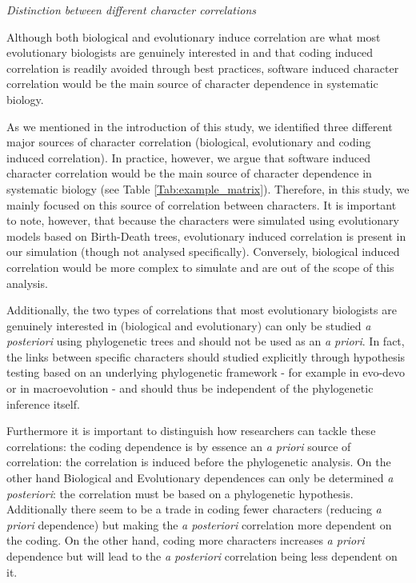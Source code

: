 \documentclass[12pt,letterpaper]{article}
\renewcommand{\subsection}[1]{%
\bigskip
\begin{center}
\begin{large}
\normalfont\itshape #1
\end{large}
\end{center}}
\begin{document}
\subsection{Distinction between different character correlations}
Although both biological and evolutionary induce correlation are what most evolutionary biologists are genuinely interested in and that coding induced correlation is readily avoided through best practices, software induced character correlation would be the main source of character dependence in systematic biology.

As we mentioned in the introduction of this study, we identified three different major sources of character correlation (biological, evolutionary and coding induced correlation).
In practice, however, we argue that software induced character correlation would be the main source of character dependence in systematic biology (see Table \ref{Tab:example_matrix}).
Therefore, in this study, we mainly focused on this source of correlation between characters.
It is important to note, however, that because the characters were simulated using evolutionary models based on Birth-Death trees, evolutionary induced correlation is present in our simulation (though not analysed specifically).
Conversely, biological induced correlation would be more complex to simulate and are out of the scope of this analysis.

Additionally, the two types of correlations that most evolutionary biologists are genuinely interested in (biological and evolutionary) can only be studied \textit{a posteriori} using phylogenetic trees and should not be used as an \textit{a priori}.
In fact, the links between specific characters should studied explicitly through hypothesis testing based on an underlying phylogenetic framework - for example in evo-devo \citep[e.g.][]{goswami2006morphological} or in macroevolution \citep[e.g.][]{fitzjohn2014much} - and should thus be independent of the phylogenetic inference itself.


Furthermore it is important to distinguish how researchers can tackle these correlations: the coding dependence is by essence an \textit{a priori} source of correlation: the correlation is induced before the phylogenetic analysis.
On the other hand Biological and Evolutionary dependences can only be determined \textit{a posteriori}: the correlation must be based on a phylogenetic hypothesis.
Additionally there seem to be a trade in coding fewer characters (reducing \textit{a priori} dependence) but making the \textit{a posteriori} correlation more dependent on the coding.
On the other hand, coding more characters increases \textit{a priori} dependence but will lead to the \textit{a posteriori} correlation being less dependent on it.
\end{document}
